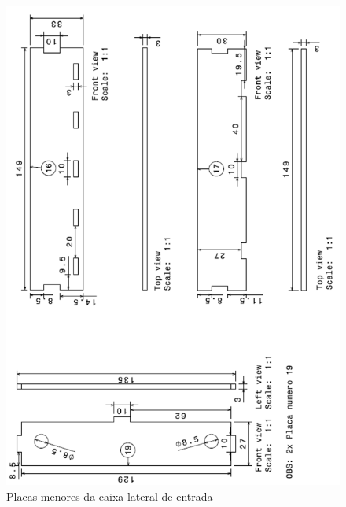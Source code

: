 \begin{anexosenv}
\begin{figure}[!ht]
	\centering
		\includegraphics[scale=0.6]{figuras/estrutura/anexos/8.png}
	\caption{Placas menores da caixa lateral de entrada}
\end{figure}


\end{anexosenv}
